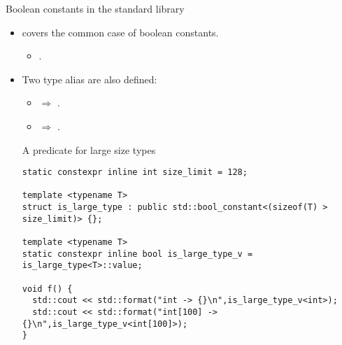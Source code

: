 \begin{frame}[t,fragile]{Boolean constants in the standard library}
\begin{itemize}
  \item {} covers the common case of boolean constants.
    \begin{itemize}
      \item {}.
    \end{itemize}

  \item Two type alias are also defined:
    \begin{itemize}
      \item {} $\Rightarrow$ \cppid{>}.
      \item {} $\Rightarrow$ \cppid{>}.
    \end{itemize}

\begin{block}{A predicate for large size types}
\begin{lstlisting}[basicstyle=\mode<presentation>{\tiny}]
static constexpr inline int size_limit = 128;

template <typename T>
struct is_large_type : public std::bool_constant<(sizeof(T) > size_limit)> {};

template <typename T>
static constexpr inline bool is_large_type_v = is_large_type<T>::value;

void f() {
  std::cout << std::format("int -> {}\n",is_large_type_v<int>);
  std::cout << std::format("int[100] -> {}\n",is_large_type_v<int[100]>); 
}
\end{lstlisting}
\end{block}
 
\end{itemize}
\end{frame}
